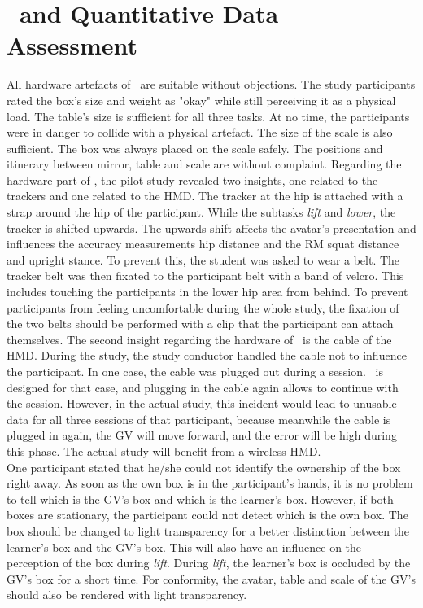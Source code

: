 \section{\exgo\ and Quantitative Data Assessment}
\label{sec:evalSystem}
All hardware artefacts of \exgo\ are suitable without objections. The study participants rated the box's size and weight as "okay" while still perceiving it as a physical load. The table's size is sufficient for all three tasks. At no time, the participants were in danger to collide with a physical artefact. The size of the scale is also sufficient. The box was always placed on the scale safely. The positions and itinerary between mirror, table and scale are without complaint. Regarding the hardware part of \exgo, the pilot study revealed two insights, one related to the trackers and one related to the HMD. The tracker at the hip is attached with a strap around the hip of the participant. While the subtasks \textit{lift} and \textit{lower}, the tracker is shifted upwards. The upwards shift affects the avatar's presentation and influences the accuracy measurements hip distance and the RM squat distance and upright stance. To prevent this, the student was asked to wear a belt. The tracker belt was then fixated to the participant belt with a band of velcro. This includes touching the participants in the lower hip area from behind. To prevent participants from feeling uncomfortable during the whole study, the fixation of the two belts should be performed with a clip that the participant can attach themselves. The second insight regarding the hardware of \exgo\ is the cable of the HMD. During the study, the study conductor handled the cable not to influence the participant. In one case, the cable was plugged out during a session. \exgo\ is designed for that case, and plugging in the cable again allows to continue with the session. However, in the actual study, this incident would lead to unusable data for all three sessions of that participant, because meanwhile the cable is plugged in again, the GV will move forward, and the error will be high during this phase. The actual study will benefit from a wireless HMD.\\
One participant stated that he/she could not identify the ownership of the box right away. As soon as the own box is in the participant's hands, it is no problem to tell which is the GV's box and which is the learner's box. However, if both boxes are stationary, the participant could not detect which is the own box. The box should be changed to light transparency for a better distinction between the learner's box and the GV's box. This will also have an influence on the perception of the box during \textit{lift}. During \textit{lift}, the learner's box is occluded by the GV's box for a short time. For conformity, the avatar, table and scale of the GV's should also be rendered with light transparency.\\
